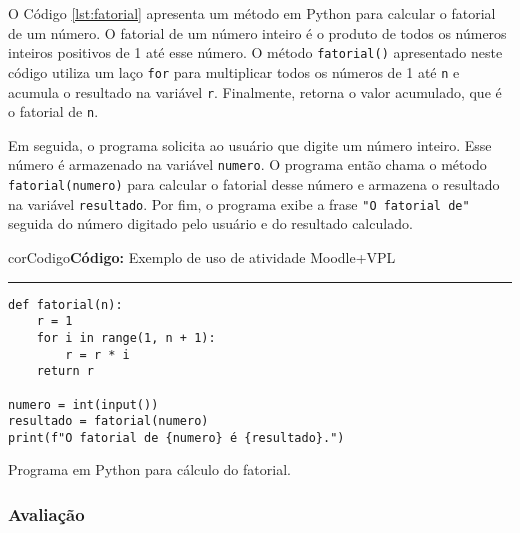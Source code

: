 O Código \ref{lst:fatorial} apresenta um método em Python para calcular o fatorial de um número. O fatorial de um número inteiro é o produto de todos os números inteiros positivos de 1 até esse número.
%
O método \verb|fatorial()| apresentado neste código utiliza um laço \verb|for| para multiplicar todos os números de 1 até \verb|n| e acumula o resultado na variável \verb|r|. Finalmente, retorna o valor acumulado, que é o fatorial de \verb|n|.

Em seguida, o programa solicita ao usuário que digite um número inteiro. Esse número é armazenado na variável \verb|numero|. O programa então chama o método \verb|fatorial(numero)| para calcular o fatorial desse número e armazena o resultado na variável \verb|resultado|. Por fim, o programa exibe a frase \verb|"O fatorial de"| seguida do número digitado pelo usuário e do resultado calculado.





\begin{listing}[!ht]
\begin{myboxCode}{corCodigo}{\textbf{Código: } Exemplo de uso de atividade Moodle+VPL}\vspace{3mm}
\hrule
\begin{verbatim}
def fatorial(n):
    r = 1
    for i in range(1, n + 1):
        r = r * i
    return r

numero = int(input())
resultado = fatorial(numero)
print(f"O fatorial de {numero} é {resultado}.")
\end{verbatim}
\end{myboxCode}
\caption{Programa em Python para cálculo do fatorial.}
\label{lst:fatorial}
\end{listing}


\subsubsection{Avaliação}

